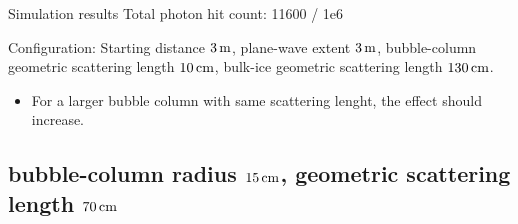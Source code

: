 \begin{frame}[fragile]{Simulation results}
  \tiny Total photon hit count: 11600 / 1e6

  \tiny Configuration: Starting distance $3\text{\,m}$, plane-wave extent $3\text{\,m}$, bubble-column geometric scattering length $10\text{\,cm}$, bulk-ice geometric scattering length $130\text{\,cm}$.
  \normalsize

  \begin{itemize}
    \item For a larger bubble column with same scattering lenght, the effect should increase. \checkmark
  \end{itemize}
\end{frame}

\subsection{bubble-column radius $15\text{\,cm}$, geometric scattering length $70\text{\,cm}$}
